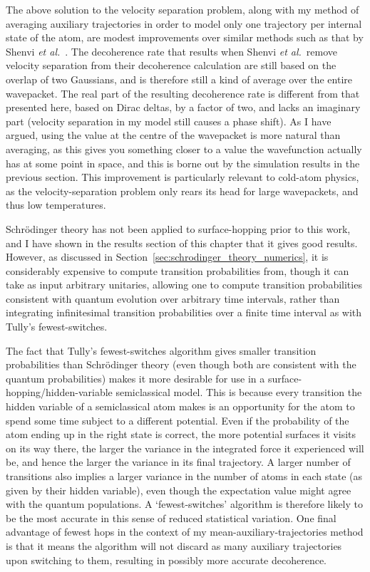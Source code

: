 The above solution to the velocity separation problem, along with my method of averaging auxiliary trajectories in order to model only one trajectory per internal state of the atom, are modest improvements over similar methods such as that by Shenvi \emph{et al.}~\cite{doi:10.1063/1.3575588}. The decoherence rate that results when Shenvi \emph{et al.}~remove velocity separation from their decoherence calculation are still based on the overlap of two Gaussians, and is therefore still a kind of average over the entire wavepacket. The real part of the resulting decoherence rate is different from that presented here, based on Dirac deltas, by a factor of two, and lacks an imaginary part (velocity separation in my model still causes a phase shift). As I have argued, using the value at the centre of the wavepacket is more natural than averaging, as this gives you something closer to a value the wavefunction actually has at some point in space, and this is borne out by the simulation results in the previous section. This improvement is particularly relevant to cold-atom physics, as the velocity-separation problem only rears its head for large wavepackets, and thus low temperatures.

Schr\"odinger theory has not been applied to surface-hopping prior to this work, and I have shown in the results section of this chapter that it gives good results. However, as discussed in Section~\ref{sec:schrodinger_theory_numerics}, it is considerably expensive to compute transition probabilities from, though it can take as input arbitrary unitaries, allowing one to compute transition probabilities consistent with quantum evolution over arbitrary time intervals, rather than integrating infinitesimal transition probabilities over a finite time interval as with Tully's fewest-switches. 

The fact that Tully's fewest-switches algorithm gives smaller transition probabilities than Schr\"odinger theory (even though both are consistent with the quantum probabilities) makes it more desirable for use in a surface-hopping/hidden-variable semiclassical model. This is because every transition the hidden variable of a semiclassical atom makes is an opportunity for the atom to spend some time subject to a different potential. Even if the probability of the atom ending up in the right state is correct, the more potential surfaces it visits on its way there, the larger the variance in the integrated force it experienced will be, and hence the larger the variance in its final trajectory. A larger number of transitions also implies a larger variance in the number of atoms in each state (as given by their hidden variable), even though the expectation value might agree with the quantum populations. A `fewest-switches' algorithm is therefore likely to be the most accurate in this sense of reduced statistical variation. One final advantage of fewest hops in the context of my mean-auxiliary-trajectories method is that it means the algorithm will not discard as many auxiliary trajectories upon switching to them, resulting in possibly more accurate decoherence.

